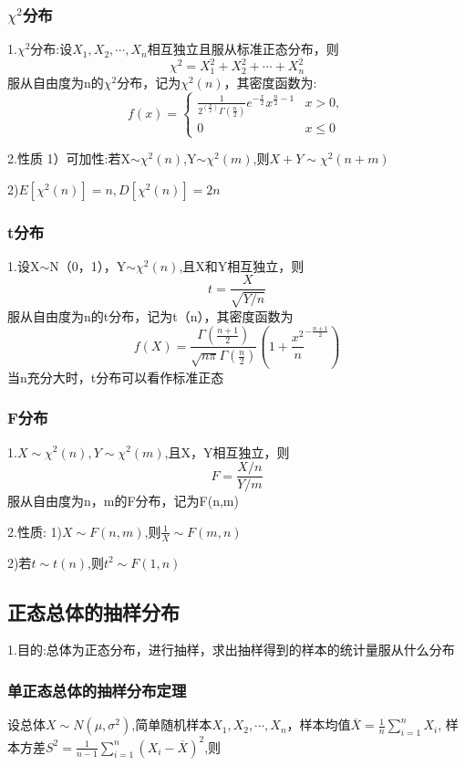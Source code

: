 \documentclass[11pt,twoside,a4paper]{ctexart}
\begin{document}
\subsubsection{$\chi ^2$分布}
1.$\chi ^2$分布:设$X_1,X_2,\cdots ,X_n$相互独立且服从标准正态分布，则
\[\chi ^2 = X_1^2 + X_2^2 + \cdots + X_n^2\]
服从自由度为n的$\chi ^2$分布，记为$\chi^2(n)$，其密度函数为:
\[f(x) = 
\begin{cases}
    \frac{1}{2^(\frac{n}{2}) \Gamma (\frac{n}{2})}e^{-\frac{x}{2}}x^{\frac{n}{2}-1} & x>0, \\
    0 & x \leq 0
\end{cases}\]

2.性质
1）可加性:若X$\sim  \chi^2(n)$,Y$ \sim \chi^2(m)$,则$X + Y \sim \chi^2(n+m)$

2)$E[\chi ^2(n)] = n,D[\chi ^2(n)] = 2n$

\subsubsection{t分布}
1.设X$\sim $N（0，1），Y$\sim \chi^2(n)$,且X和Y相互独立，则
\[t = \frac{X}{\sqrt{Y/n}}\]
服从自由度为n的t分布，记为t（n），其密度函数为
\[f(X) = \frac{\Gamma (\frac{n+1}{2})}{\sqrt{n\pi }\Gamma (\frac{n}{2})}(1 + \frac{x^2}{n}^{-\frac{n+1}{2}})\]
当n充分大时，t分布可以看作标准正态

\subsubsection{F分布}
1.$X\sim \chi^2(n),Y\sim \chi^2(m)$,且X，Y相互独立，则
\[F = \frac{X/n}{Y/m}\]
服从自由度为n，m的F分布，记为F(n,m)

2.性质:
1)$X\sim F(n,m)$,则$\frac{1}{X}\sim F(m,n)$

2)若$t\sim t(n)$,则$t^2 \sim F(1,n)$

\subsection{正态总体的抽样分布}
1.目的:总体为正态分布，进行抽样，求出抽样得到的样本的统计量服从什么分布

\subsubsection{单正态总体的抽样分布定理}
设总体$X\sim N(\mu ,\sigma ^2)$,简单随机样本$X_1,X_2,\cdots ,X_n$，样本均值$\overline{X} = \frac{1}{n}\sum _{i=1}^n X_i$,
样本方差$S^2 = \frac{1}{n-1}\sum _{i=1}^n(X_i - \overline{X})^2$,则
\end{document}
